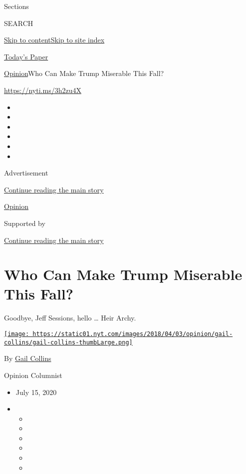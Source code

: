 Sections

SEARCH

\protect\hyperlink{site-content}{Skip to
content}\protect\hyperlink{site-index}{Skip to site index}

\href{https://myaccount.nytimes.com/auth/login?response_type=cookie\&client_id=vi}{}

\href{https://www.nytimes.com/section/todayspaper}{Today's Paper}

\href{/section/opinion}{Opinion}\textbar{}Who Can Make Trump Miserable
This Fall?

\href{https://nyti.ms/3h2zu4X}{https://nyti.ms/3h2zu4X}

\begin{itemize}
\item
\item
\item
\item
\item
\item
\end{itemize}

Advertisement

\protect\hyperlink{after-top}{Continue reading the main story}

\href{/section/opinion}{Opinion}

Supported by

\protect\hyperlink{after-sponsor}{Continue reading the main story}

\hypertarget{who-can-make-trump-miserable-this-fall}{%
\section{Who Can Make Trump Miserable This
Fall?}\label{who-can-make-trump-miserable-this-fall}}

Goodbye, Jeff Sessions, hello \ldots{} Heir Archy.

\href{https://www.nytimes.com/by/gail-collins}{\texttt{[image: https://static01.nyt.com/images/2018/04/03/opinion/gail-collins/gail-collins-thumbLarge.png]}}

By \href{https://www.nytimes.com/by/gail-collins}{Gail Collins}

Opinion Columnist

\begin{itemize}
\item
  July 15, 2020
\item
  \begin{itemize}
  \item
  \item
  \item
  \item
  \item
  \item
  \end{itemize}
\end{itemize}

